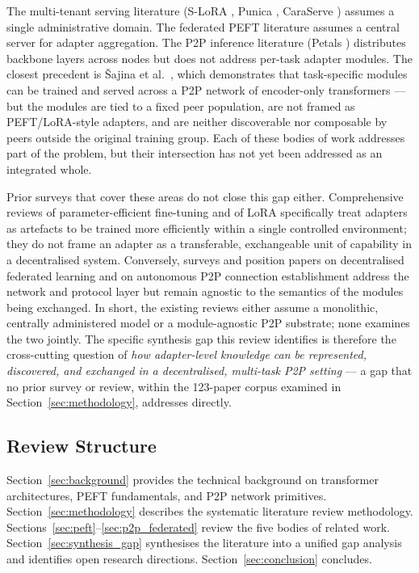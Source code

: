 The multi-tenant serving literature (S-LoRA \cite{Sheng2024}, Punica \cite{Chen2023Punica}, 
CaraServe \cite{Li2024CaraServe}) assumes a single administrative domain. 
The federated PEFT literature assumes a central server for adapter aggregation. 
The P2P inference literature (Petals \cite{Borzunov2023}) distributes backbone 
layers across nodes but does not address per-task adapter modules. The closest precedent is 
{\v{S}}ajina et al.~\cite{Sajina2024}, which demonstrates that task-specific modules can be trained and served 
across a P2P network of encoder-only transformers — but the modules are tied to a fixed peer 
population, are not framed as PEFT/LoRA-style adapters, and are neither discoverable nor composable 
by peers outside the original training group. Each of these bodies of work addresses part
of the problem, but their intersection has not yet been addressed as an integrated whole.

Prior surveys that cover these areas do not close this gap either. Comprehensive reviews of
parameter-efficient fine-tuning \cite{Han2024,WangAIReview2024} and of LoRA specifically
\cite{MaoLoraSurvey2024} treat adapters as artefacts to be trained more efficiently within a
single controlled environment; they do not frame an adapter as a transferable, exchangeable
unit of capability in a decentralised system. Conversely, surveys and position papers on
decentralised federated learning \cite{YeDecentralizedFL2022,WinkP2PFL2021} and on autonomous
P2P connection establishment \cite{SajinaP2PConnection2024} address the network and protocol
layer but remain agnostic to the semantics of the modules being exchanged. In short, the
existing reviews either assume a monolithic, centrally administered model or a module-agnostic
P2P substrate; none examines the two jointly. The specific synthesis gap this review identifies is
therefore the cross-cutting question of \emph{how adapter-level knowledge can be represented,
discovered, and exchanged in a decentralised, multi-task P2P setting} --- a gap that no prior
survey or review, within the 123-paper corpus examined in
Section~\ref{sec:methodology}, addresses directly.

\subsection{Review Structure}
\label{sec:introduction:structure}

Section~\ref{sec:background} provides the technical background on transformer
architectures, PEFT fundamentals, and P2P network primitives. Section~\ref{sec:methodology}
describes the systematic literature review methodology. Sections~\ref{sec:peft}--\ref{sec:p2p_federated}
review the five bodies of related work. Section~\ref{sec:synthesis_gap} synthesises the
literature into a unified gap analysis and identifies open research directions.
Section~\ref{sec:conclusion} concludes.
